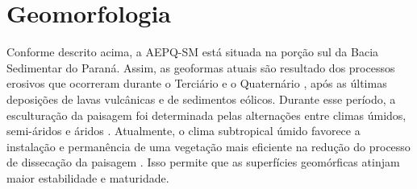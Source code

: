 \documentclass[final]{article}
\begin{document}
\section{Geomorfologia}

Conforme descrito acima, a AEPQ-SM está situada na porção sul da Bacia Sedimentar do Paraná. Assim, as geoformas atuais são resultado dos processos erosivos que ocorreram durante o Terciário e o Quaternário \cite{Sartori2009}, após as últimas deposições de lavas vulcânicas e de sedimentos eólicos. Durante esse período, a esculturação da paisagem foi determinada pelas alternações entre climas úmidos, semi-áridos e áridos \cite{Sartori2009}. Atualmente, o clima subtropical úmido favorece a instalação e permanência de uma vegetação mais eficiente na redução do processo de dissecação da paisagem \cite{Sartori2009, NascimentoEtAl2010}. Isso permite que as superfícies geomórficas atinjam maior estabilidade e maturidade.

\end{document}
